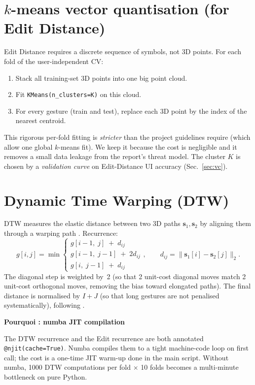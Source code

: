\documentclass[11pt,a4paper]{article}
\newenvironment{whybox}[1]{%
    \begin{shaded*}\noindent\textbf{Pourquoi : #1}\par\vspace{0.3em}}
    {\end{shaded*}}
\renewenvironment{shaded*}
    {\definecolor{shadecolor}{named}{whyboxbg}\begin{shaded}}
    {\end{shaded}}
\begin{document}
\section{$k$-means vector quantisation (for Edit Distance)}

Edit Distance requires a discrete sequence of symbols, not 3D points.
For each fold of the user-independent CV:
\begin{enumerate}[itemsep=0.2em,topsep=0.2em]
    \item Stack all training-set 3D points into one big point cloud.
    \item Fit \texttt{KMeans(n\_clusters=K)} on this cloud.
    \item For every gesture (train and test), replace each 3D point
          by the index of the nearest centroid.
\end{enumerate}

This rigorous per-fold fitting is \emph{stricter} than the
project guidelines require (which allow one global $k$-means fit). We
keep it because the cost is negligible and it removes a small data
leakage from the report's threat model. The cluster $K$ is chosen by a
\emph{validation curve} on Edit-Distance UI accuracy
(Sec.~\ref{sec:vc}).

\section{Dynamic Time Warping (DTW)}

DTW measures the elastic distance between two 3D paths
$\mathbf{s}_1,\mathbf{s}_2$ by aligning them through a warping path
\cite{sakoe1978dtw}. Recurrence:
\[
g[i,j] = \min \begin{cases}
    g[i{-}1,\;j]\;+\;d_{ij} \\
    g[i{-}1,\;j{-}1]\;+\;2 d_{ij} \\
    g[i,\;j{-}1]\;+\;d_{ij}
\end{cases},
\qquad
d_{ij}=\|\mathbf{s}_1[i]-\mathbf{s}_2[j]\|_2.
\]
The diagonal step is weighted by~2 (so that 2 unit-cost diagonal moves
match 2 unit-cost orthogonal moves, removing the bias toward elongated
paths). The final distance is normalised by $I+J$ (so that long
gestures are not penalised systematically), following
\cite{mueller2007info}.

\begin{whybox}{numba JIT compilation}
The DTW recurrence and the Edit recurrence are both annotated
\texttt{@njit(cache=True)}. Numba compiles them to a tight machine-code
loop on first call; the cost is a one-time JIT warm-up done in the
main script. Without numba, 1000 DTW computations per fold $\times$ 10
folds becomes a multi-minute bottleneck on pure Python.
\end{whybox}
\end{document}
